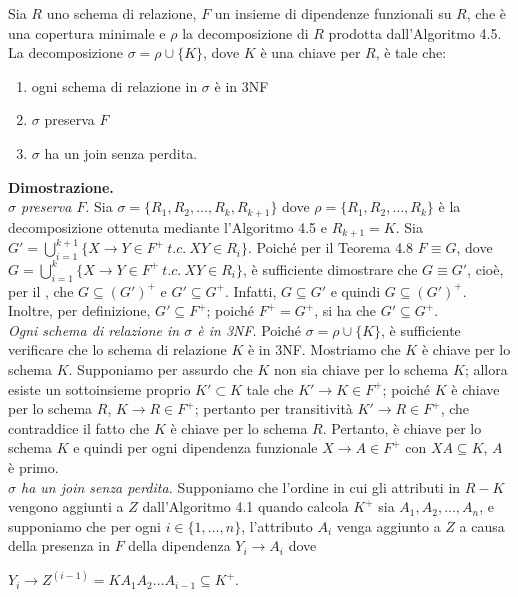 \begin{theo}
Sia $R$ uno schema di relazione, $F$ un insieme di dipendenze funzionali su $R$, che è una copertura minimale e $\rho$
la decomposizione di $R$ prodotta dall'Algoritmo 4.5. La decomposizione $\sigma = \rho \cup \{K\}$, dove $K$ è una 
chiave per $R$, è tale che:
\begin{enumerate}
 \item ogni schema di relazione in $\sigma$ è in 3NF
 \item $\sigma$ preserva $F$
 \item $\sigma$ ha un join senza perdita. 
\end{enumerate}
\end{theo}
\textbf{Dimostrazione.}\\
\emph{$\sigma$ preserva $F$}. Sia $\sigma =\{R_1, R_2, \ldots, R_k, R_{k+1}\}$ dove $\rho=\{R_1, R_2, \ldots, R_k\}$ 
è la decomposizione ottenuta mediante l'Algoritmo 4.5 e $R_{k+1} = K$. Sia $G'= \bigcup_{i=1}^{k+1}\{X\rightarrow Y 
\in F^+\ t.c.\ XY \in R_i\}$. Poiché per il Teorema 4.8 $F\equiv G$, dove $G = \bigcup_{i=1}^k \{X\rightarrow Y\in F^+
\ t.c.\ XY\in R_i\}$, è sufficiente dimostrare che $G\equiv G'$, cioè, per il , che 
$G\subseteq (G')^+$ e $G'\subseteq G^+$. Infatti, $G\subseteq G'$ e quindi $G\subseteq (G')^+$. Inoltre, per 
definizione, $G' \subseteq F^+$; poiché $F^+ =G^+$, si ha che $G'\subseteq G^+$.\\
\emph{Ogni schema di relazione in $\sigma$ è in 3NF}. Poiché $\sigma =\rho \cup \{K\}$, è sufficiente verificare che 
lo schema di relazione $K$ è in 3NF. Mostriamo che $K$ è chiave per lo schema $K$. Supponiamo per assurdo che
$K$ non sia chiave per lo schema $K$; allora esiste un sottoinsieme proprio $K' \subset K$ tale che $K'\rightarrow 
K \in F^+$; poiché $K$ è chiave per lo schema $R$, $K\rightarrow R \in F^+$; pertanto per transitività $K'\rightarrow
R \in F^+$, che contraddice il fatto che $K$ è chiave per lo schema $R$. Pertanto, è chiave per lo schema $K$ e quindi per
ogni dipendenza funzionale $X \rightarrow A \in F^+$ con $XA \subseteq K$, $A$ è primo.\\
\emph{$\sigma$ ha un join senza perdita.} Supponiamo che l'ordine in cui gli attributi in $R-K$ vengono aggiunti a
$Z$ dall'Algoritmo 4.1 quando calcola $K^+$ sia $A_1, A_2, \ldots, A_n$, e supponiamo che per ogni $i \in 
\{1, \ldots, n\}$, l'attributo $A_i$ venga aggiunto a $Z$ a causa della presenza in $F$ della dipendenza $Y_i 
\rightarrow A_i$ dove 
\begin{center}
$Y_i \rightarrow Z^{(i-1)} = KA_1A_2\ldots A_{i-1} \subseteq K^+$. 
\end{center}

